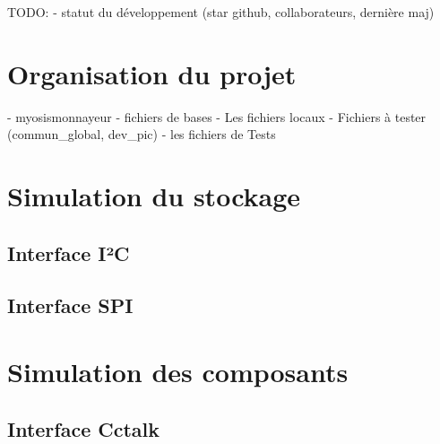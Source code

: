 \documentclass[a4paper]{article}
\begin{document}
TODO:
- statut du développement (star github, collaborateurs, dernière maj)

\section{Organisation du projet}

- myosismonnayeur
- fichiers de bases
  - Les fichiers locaux
  - Fichiers à tester (commun\_global, dev\_pic)
- les fichiers de Tests

\section{Simulation du stockage}

\subsection{Interface I²C}


\subsection{Interface SPI}



\section{Simulation des composants}

\subsection{Interface Cctalk}
\end{document}
